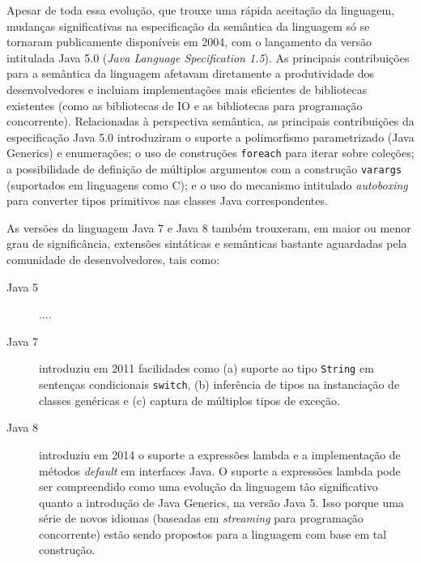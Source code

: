 Apesar de toda essa evolu\c c\~{a}o, que trouxe uma r\'{a}pida aceita\c c\~{a}o da linguagem, mudan\c cas significativas na especifica\c c\~{a}o da sem\^{a}ntica da linguagem s\'{o} se tornaram publicamente dispon\'{i}veis em 2004, com o lan\c camento da vers\~{a}o intitulada Java 5.0 (\emph{Java Language Specification 1.5}). As principais contribui\c c\~{o}es para a sem\^{a}ntica da linguagem afetavam diretamente a produtividade dos desenvolvedores e incluiam implementa\c c\~{o}es mais eficientes de bibliotecas existentes (como as bibliotecas de IO e as bibliotecas para programa\c c\~{a}o concorrente). Relacionadas \`{a} perspectiva sem\^{a}ntica, as principais contribui\c c\~{o}es da especifica\c c\~{a}o Java 5.0 introduziram o suporte a polimorfismo parametrizado (Java Generics) e enumera\c c\~{o}es; o uso de constru\c c\~{o}es \texttt{foreach} para iterar sobre cole\c c\~{o}es; a possibilidade de defini\c c\~{a}o de m\'{u}ltiplos argumentos com a constru\c c\~{a}o \texttt{varargs} (suportados em linguagens como C); e o uso do mecanismo intitulado \emph{autoboxing} para converter tipos primitivos nas classes Java correspondentes. 

As versões da linguagem Java 7 e Java 8 também trouxeram, 
em maior ou menor grau de significância, extensões sintáticas 
e semânticas bastante aguardadas pela comunidade de 
desenvolvedores, tais como:

\begin{description}
\item[Java 5] ....

\item[Java 7] introduziu em 2011 facilidades como (a) suporte ao tipo \texttt{String} 
em senten\c cas condicionais \texttt{switch}, (b) infer\^{e}ncia de tipos 
na instancia\c c\~{a}o de classes gen\'{e}ricas e (c) captura de 
m\'{u}ltiplos tipos de exce\c c\~{a}o. 

\item[Java 8] introduziu em 2014 o suporte a express\~{o}es lambda e a implementa\c c\~{a}o de 
m\'{e}todos \emph{default} em interfaces Java. O suporte a express\~{o}es lambda pode 
ser compreendido como uma evolu\c c\~{a}o da linguagem t\~{a}o significativo 
quanto a introdu\c c\~{a}o de Java Generics, na vers\~{a}o Java 5. Isso porque 
uma s\'{e}rie de novos idiomas (baseadas em \emph{streaming} para programa\c c\~{a}o 
concorrente) est\~{a}o sendo propostos para a linguagem com base em tal constru\c c\~{a}o.   
\end{description} 

